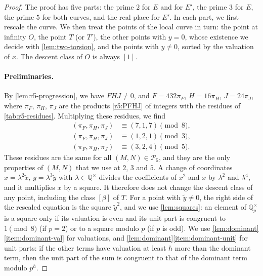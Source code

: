 \documentclass[12pt,oneside,openany]{book}
\theoremstyle{definition}
\theoremstyle{plain}
\numberwithin{equation}{chapter}
\theoremstyle{plain}
\theoremstyle{definition}
\theoremstyle{remark}
\newcommand{\Q}{\mathbb Q}
\newcommand{\sq}[1]{[#1]}
\newcommand{\cP}{\mathcal P}
\begin{document}
\begin{proof}
The proof has five parts: the prime $2$ for $E$ and for $E'$, the prime $3$ for $E$, the prime $5$ for both curves, and the real place for $E'$. In each part, we first rescale the curve. We then treat the points of the local curve in turn: the point at infinity $O$, the point $T$ (or $T'$), the other points with $y=0$, whose existence we decide with \cref{lem:two-torsion}, and the points with $y\ne0$, sorted by the valuation of $x$. The descent class of $O$ is always $\sq1$.

\paragraph{Preliminaries.} By \cref{lem:r5-progression}, we have $FHJ\ne0$, and $F=432\pi_F$, $H=16\pi_H$, $J=24\pi_J$, where $\pi_F$, $\pi_H$, $\pi_J$ are the products \eqref{r5:PFHJ} of integers with the residues of \cref{tab:r5-residues}. Multiplying these residues, we find
\begin{equation}\label{r5:P-residues}
\begin{aligned}
(\pi_F,\pi_H,\pi_J)&\equiv(7,1,7)\pmod8,\\
(\pi_F,\pi_H,\pi_J)&\equiv(1,2,1)\pmod3,\\
(\pi_F,\pi_H,\pi_J)&\equiv(3,2,4)\pmod5.
\end{aligned}
\end{equation}
These residues are the same for all $(M,N)\in\cP_5$, and they are the only properties of $(M,N)$ that we use at $2$, $3$ and $5$. A change of coordinates $x=\lambda^2\tilde x$, $y=\lambda^3\tilde y$ with $\lambda\in\Q^\times$ divides the coefficients of $x^2$ and $x$ by $\lambda^2$ and $\lambda^4$, and it multiplies $x$ by a square. It therefore does not change the descent class of any point, including the class $\sq\beta$ of $T$. For a point with $\tilde y\ne0$, the right side of the rescaled equation is the square $\tilde y^2$, and we use \cref{lem:squares}: an element of $\Q_p^\times$ is a square only if its valuation is even and its unit part is congruent to $1\pmod8$ (if $p=2$) or to a square modulo $p$ (if $p$ is odd). We use \cref{lem:dominant}\ref{item:dominant-val} for valuations, and \cref{lem:dominant}\ref{item:dominant-unit} for unit parts: if the other terms have valuation at least $h$ more than the dominant term, then the unit part of the sum is congruent to that of the dominant term modulo $p^h$.


\end{proof}
\end{document}
